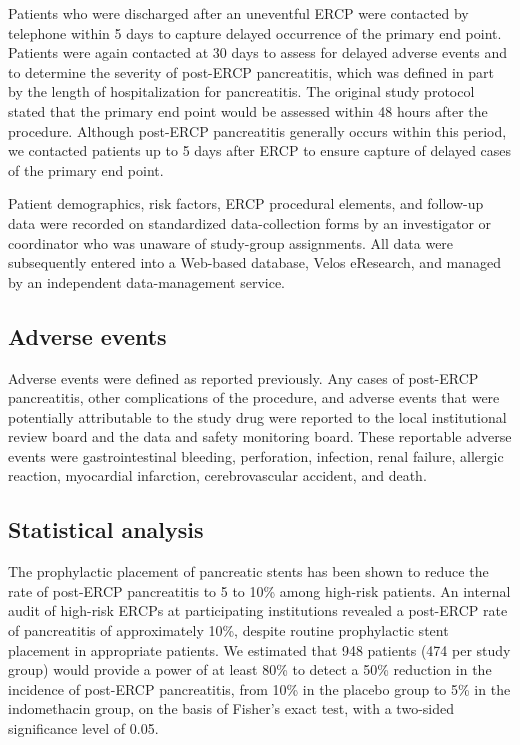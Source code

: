 \documentclass[
  10pt,
  letterpaper,
]{article}
\begin{document}
Patients who were discharged after an uneventful ERCP were contacted by
telephone within 5 days to capture delayed occurrence of the primary end
point. Patients were again contacted at 30 days to assess for delayed
adverse events and to determine the severity of post-ERCP pancreatitis,
which was defined in part by the length of hospitalization for
pancreatitis. The original study protocol stated that the primary end
point would be assessed within 48 hours after the procedure. Although
post-ERCP pancreatitis generally occurs within this period, we contacted
patients up to 5 days after ERCP to ensure capture of delayed cases of
the primary end point.

Patient demographics, risk factors, ERCP procedural elements, and
follow-up data were recorded on standardized data-collection forms by an
investigator or coordinator who was unaware of study-group assignments.
All data were subsequently entered into a Web-based database, Velos
eResearch, and managed by an independent data-management service.

\subsection{Adverse events}\label{adverse-events}

Adverse events were defined as reported
previously.\citep{cotton1991, mallery2003} Any cases of post-ERCP
pancreatitis, other complications of the procedure, and adverse events
that were potentially attributable to the study drug were reported to
the local institutional review board and the data and safety monitoring
board. These reportable adverse events were gastrointestinal bleeding,
perforation, infection, renal failure, allergic reaction, myocardial
infarction, cerebrovascular accident, and death.

\subsection{Statistical analysis}\label{statistical-analysis}

The prophylactic placement of pancreatic stents has been shown to reduce
the rate of post-ERCP pancreatitis to 5 to 10\% among high-risk
patients.\citep{tarnasky1998, fazel2003, singh2004} An internal audit of
high-risk ERCPs at participating institutions revealed a post-ERCP rate
of pancreatitis of approximately 10\%, despite routine prophylactic
stent placement in appropriate patients. We estimated that 948 patients
(474 per study group) would provide a power of at least 80\% to detect a
50\% reduction in the incidence of post-ERCP pancreatitis, from 10\% in
the placebo group to 5\% in the indomethacin group, on the basis of
Fisher's exact test, with a two-sided significance level of 0.05.
\end{document}
